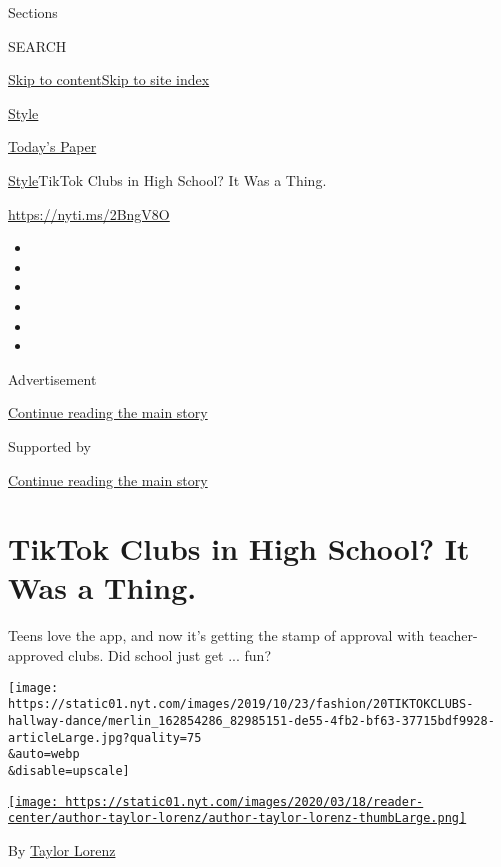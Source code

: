 Sections

SEARCH

\protect\hyperlink{site-content}{Skip to
content}\protect\hyperlink{site-index}{Skip to site index}

\href{https://www.nytimes.com/section/style}{Style}

\href{https://myaccount.nytimes.com/auth/login?response_type=cookie\&client_id=vi}{}

\href{https://www.nytimes.com/section/todayspaper}{Today's Paper}

\href{/section/style}{Style}\textbar{}TikTok Clubs in High School? It
Was a Thing.

\url{https://nyti.ms/2BngV8O}

\begin{itemize}
\item
\item
\item
\item
\item
\item
\end{itemize}

Advertisement

\protect\hyperlink{after-top}{Continue reading the main story}

Supported by

\protect\hyperlink{after-sponsor}{Continue reading the main story}

\hypertarget{tiktok-clubs-in-high-school-it-was-a-thing}{%
\section{TikTok Clubs in High School? It Was a
Thing.}\label{tiktok-clubs-in-high-school-it-was-a-thing}}

Teens love the app, and now it's getting the stamp of approval with
teacher-approved clubs. Did school just get ... fun?

\texttt{[image: https://static01.nyt.com/images/2019/10/23/fashion/20TIKTOKCLUBS-hallway-dance/merlin\_162854286\_82985151-de55-4fb2-bf63-37715bdf9928-articleLarge.jpg?quality=75\\\&auto=webp\\\&disable=upscale]}

\href{https://www.nytimes.com/by/taylor-lorenz}{\texttt{[image: https://static01.nyt.com/images/2020/03/18/reader-center/author-taylor-lorenz/author-taylor-lorenz-thumbLarge.png]}}

By \href{https://www.nytimes.com/by/taylor-lorenz}{Taylor Lorenz}

